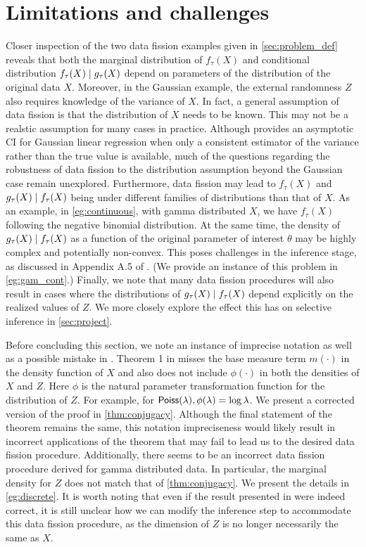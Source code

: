 \section{Limitations and challenges}
Closer inspection of the two data fission examples given in \cref{sec:problem_def} reveals that both the marginal distribution of $f_\tau(X)$ and conditional distribution $f_\tau(X) \mid g_\tau(X)$ depend on parameters of the distribution of the original data $X$. Moreover, in the Gaussian example, the external randomness $Z$ also requires knowledge of the variance of $X$. In fact, a general assumption of data fission is that the distribution of $X$ needs to be known. This may not be a realstic assumption for many cases in practice. Although \cite{leiner2022data} provides an asymptotic CI for Gaussian linear regression when only a consistent estimator of the variance rather than the true value is available, much of the questions regarding the robustness of data fission to the distribution assumption beyond the Gaussian case remain unexplored. Furthermore, data fission may lead to $f_\tau(X)$ and $g_\tau(X) \mid f_\tau(X)$ being under different families of distributions than that of $X$. As an example, in \cref{eg:continuous}, with gamma distributed $X$, we have $f_\tau(X)$ following the negative binomial distribution. At the same time, the density of $g_\tau(X)\mid f_\tau(X)$ as a function of the original parameter of interest $\theta$ may be highly complex and potentially non-convex. This poses challenges in the inference stage, as discussed in Appendix A.5 of \cite{leiner2022data}. (We provide an instance of this problem in \cref{eg:gam_cont}.) Finally, we note that many data fission procedures will also result in cases where the distributions of $g_\tau(X)\mid f_\tau(X)$ depend explicitly on the realized values of $Z$. We more closely explore the effect this has on selective inference in \cref{sec:project}.

Before concluding this section, we note an instance of imprecise notation as well as a possible mistake in \cite{leiner2022data}. Theorem 1 in \cite{leiner2022data} misses the base measure term $m(\cdot)$ in the density function of $X$ and also does not include $\phi(\cdot)$ in both the densities of $X$ and $Z$. Here $\phi$ is the natural parameter transformation function for the distribution of $Z$. For example, for ${\sf{Poiss}}(\lambda), \phi(\lambda) = \log\lambda$. We present a corrected version of the proof in \cref{thm:conjugacy}. Although the final statement of the theorem remains the same, this notation impreciseness would likely result in incorrect applications of the theorem that may fail to lead us to the desired data fission procedure. Additionally, there seems to be an incorrect data fission procedure derived for gamma distributed data. In particular, the marginal density for $Z$ does not match that of \cref{thm:conjugacy}. We present the details in \cref{eg:discrete}. It is worth noting that even if the result presented in \cite{leiner2022data} were indeed correct, it is still unclear how we can modify the inference step to accommodate this data fission procedure, as the dimension of $Z$ is no longer necessarily the same as $X$.